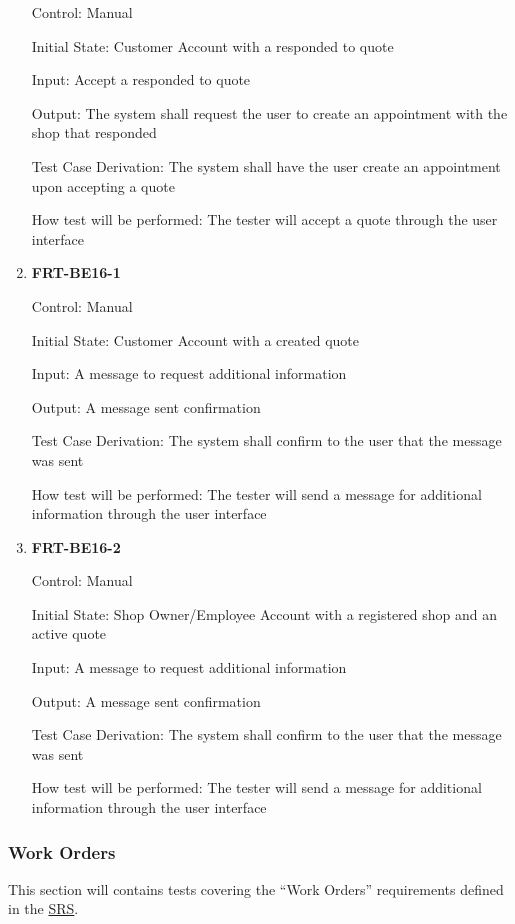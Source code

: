 \documentclass[12pt, titlepage]{article}
\begin{document}
\begin{enumerate}
	      Control: Manual

	      Initial State: Customer Account with a responded to quote

	      Input: Accept a responded to quote

	      Output: The system shall request the user to create an appointment with the shop that responded

	      Test Case Derivation: The system shall have the user create an appointment upon accepting a quote

	      How test will be performed: The tester will accept a quote through the user interface

	\item \textbf{FRT-BE16-1}

	      Control: Manual

	      Initial State: Customer Account with a created quote

	      Input: A message to request additional information

	      Output: A message sent confirmation

	      Test Case Derivation: The system shall confirm to the user that the message was sent

	      How test will be performed: The tester will send a message for additional information through the
	      user interface

	\item \textbf{FRT-BE16-2}

	      Control: Manual

	      Initial State: Shop Owner/Employee Account with a registered shop and an active quote

	      Input: A message to request additional information

	      Output: A message sent confirmation

	      Test Case Derivation: The system shall confirm to the user that the message was sent

	      How test will be performed: The tester will send a message for additional information through the
	      user interface
\end{enumerate}

\subsubsection{Work Orders}

This section will contains tests covering the ``Work Orders'' requirements defined in the
\href{https://github.com/arkinmodi/project-sayyara/blob/main/docs/SRS/SRS.pdf}{SRS}.
\end{document}
